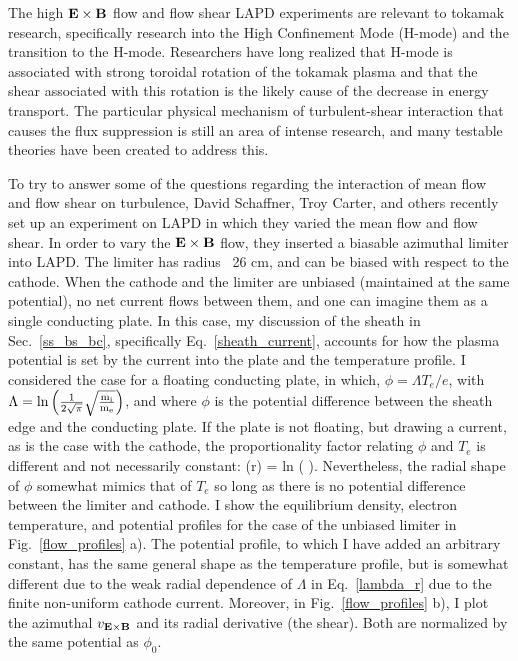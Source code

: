 The high ${\bf E \times B}$ flow and flow shear LAPD experiments are relevant to tokamak research, specifically research into the High Confinement Mode (H-mode)
and the transition to the H-mode. Researchers have long realized that H-mode is associated with strong toroidal rotation of the tokamak plasma and that the shear associated with this rotation
is the likely cause of the decrease in energy transport. The particular physical mechanism of turbulent-shear interaction that causes the flux suppression is still an area of intense
research, and many testable theories have been created to address this.

To try to answer some of the questions regarding the interaction of mean flow and flow shear on turbulence, David Schaffner, Troy Carter, and others recently set up an experiment on LAPD
in which they varied the mean flow and flow shear. In order to vary the ${\bf E \times B}$ flow, they inserted a biasable azimuthal limiter into LAPD. The limiter has radius ~26 cm, and
can be biased with respect to the cathode. When the cathode and the limiter are unbiased (maintained at the same potential), no net current flows between them, and one can imagine them
as a single conducting plate. In this case, my discussion of the sheath in Sec.~\ref{ss_bs_bc}, specifically Eq.~\ref{sheath_current}, accounts for how the plasma potential is set by
the current into the plate and the temperature profile. I considered the case for a floating conducting plate, in which, $\phi = \Lambda T_e /e$, with 
$\Lambda = \rm{ln} \left( \frac{1}{2 \sqrt{\pi}} \sqrt{\frac{m_i}{m_e}}  \right)$, and where $\phi$ is the potential difference between the sheath edge and the conducting plate. If the plate is not
floating, but drawing a current, as is the case with the cathode, the proportionality factor relating $\phi$ and $T_e$ is different and not necessarily constant:
\beq
\label{lambda_r}
\Lambda(r) = \rm{ln} \left(  \sqrt{\fmie}  \right).
\eeq
Nevertheless, the radial shape of $\phi$ somewhat mimics that of $T_e$ so long as there is no potential difference between the limiter and cathode. 
I show the equilibrium density, electron temperature, and potential profiles
for the case of the unbiased limiter in Fig.~\ref{flow_profiles} a). The potential profile, to which I have added an arbitrary constant, has the same general shape as the temperature profile,
but is somewhat different due to the weak radial dependence of $\Lambda$ in Eq.~\ref{lambda_r} due to the finite non-uniform cathode current.
Moreover, in Fig.~\ref{flow_profiles} b), I plot the azimuthal $v_{\bf E \times B}$ and its radial derivative (the shear). Both are normalized by the same potential as $\phi_0$.

